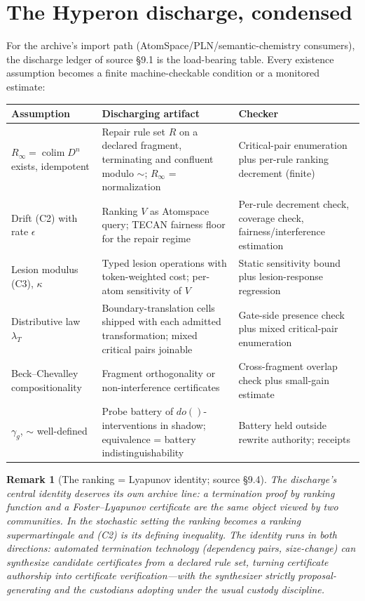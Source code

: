 \documentclass[11pt]{article}
\newtheorem{remark}{Remark}
\newcommand{\D}{D}
\newcommand{\Rinf}{R_{\infty}}
\begin{document}
\section{The Hyperon discharge, condensed}

For the archive's import path (AtomSpace/PLN/semantic-chemistry consumers), the
discharge ledger of source \S9.1 is the load-bearing table. Every existence assumption
becomes a finite machine-checkable condition or a monitored estimate:

\begin{center}
\begin{tabular}{@{}p{4.4cm}p{5.4cm}p{4.4cm}@{}}
\toprule
Assumption & Discharging artifact & Checker \\
\midrule
$\Rinf = \operatorname{colim} \D^n$ exists, idempotent & Repair rule set $R$ on a declared fragment, terminating and confluent modulo $\sim$; $\Rinf$ = normalization & Critical-pair enumeration plus per-rule ranking decrement (finite) \\
Drift (C2) with rate $\epsilon$ & Ranking $V$ as Atomspace query; TECAN fairness floor for the repair regime & Per-rule decrement check, coverage check, fairness/interference estimation \\
Lesion modulus (C3), $\kappa$ & Typed lesion operations with token-weighted cost; per-atom sensitivity of $V$ & Static sensitivity bound plus lesion-response regression \\
Distributive law $\lambda_T$ & Boundary-translation cells shipped with each admitted transformation; mixed critical pairs joinable & Gate-side presence check plus mixed critical-pair enumeration \\
Beck--Chevalley compositionality & Fragment orthogonality or non-interference certificates & Cross-fragment overlap check plus small-gain estimate \\
$\gamma_g$, $\sim$ well-defined & Probe battery of $do()$-interventions in shadow; equivalence = battery indistinguishability & Battery held outside rewrite authority; receipts \\
\bottomrule
\end{tabular}
\end{center}

\begin{remark}[The ranking = Lyapunov identity; source \S9.4]
The discharge's central identity deserves its own archive line: \emph{a termination
proof by ranking function and a Foster--Lyapunov certificate are the same object viewed
by two communities.} In the stochastic setting the ranking becomes a ranking
supermartingale and (C2) is its defining inequality. The identity runs in both
directions: automated termination technology (dependency pairs, size-change) can
\emph{synthesize} candidate certificates from a declared rule set, turning certificate
authorship into certificate verification---with the synthesizer strictly
proposal-generating and the custodians adopting under the usual custody discipline.
\end{remark}
\end{document}

